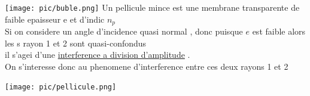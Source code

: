 \documentclass[12pt]{book}
\begin{document}
            \begin{center}
                \begin{minipage}{0.59\linewidth}
                    \texttt{[image: pic/buble.png]}
                    Un pellicule mince est une membrane transparente de faible epaisseur e et d'indic $n_p$ \\
                    Si on considere un angle d'incidence quasi normal , donc puisque $e$ est faible alors les s rayon 1 et 2 sont quasi-confondus\\
                    il s'agei d'une \underline{interference a division d'amplitude} . \\
                    On s'interesse donc au phenomene d'interference entre ces deux rayons 1 et 2 \vspace*{15px}
                \end{minipage}
                \begin{minipage}{0.38\linewidth}
                    \texttt{[image: pic/pellicule.png]}
                    
                \end{minipage}
            \end{center}
\end{document}
